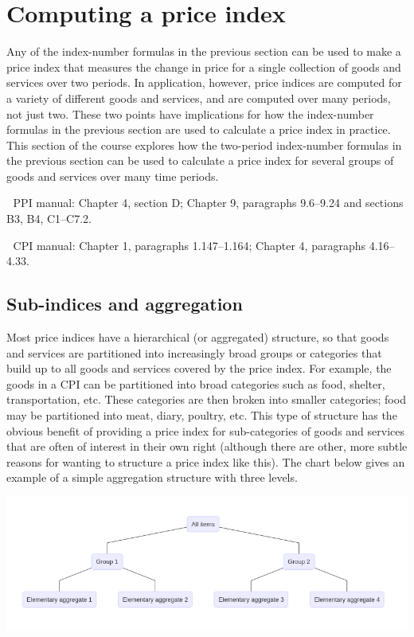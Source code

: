 \documentclass[]{article}
\begin{document}
\hypertarget{computing-a-price-index}{%
\section{Computing a price index}\label{computing-a-price-index}}

Any of the index-number formulas in the previous section can be used to make a price index that measures the change in price for a single collection of goods and services over two periods. In application, however, price indices are computed for a variety of different goods and services, and are computed over many periods, not just two. These two points have implications for how the index-number formulas in the previous section are used to calculate a price index in practice. This section of the course explores how the two-period index-number formulas in the previous section can be used to calculate a price index for several groups of goods and services over many time periods.

📖 PPI manual: Chapter 4, section D; Chapter 9, paragraphs 9.6--9.24 and sections B3, B4, C1--C7.2.

📖 CPI manual: Chapter 1, paragraphs 1.147--1.164; Chapter 4, paragraphs 4.16--4.33.

\hypertarget{sub-indices-and-aggregation}{%
\subsection{Sub-indices and aggregation}\label{sub-indices-and-aggregation}}

Most price indices have a hierarchical (or aggregated) structure, so that goods and services are partitioned into increasingly broad groups or categories that build up to all goods and services covered by the price index. For example, the goods in a CPI can be partitioned into broad categories such as food, shelter, transportation, etc. These categories are then broken into smaller categories; food may be partitioned into meat, diary, poultry, etc. This type of structure has the obvious benefit of providing a price index for sub-categories of goods and services that are often of interest in their own right (although there are other, more subtle reasons for wanting to structure a price index like this). The chart below gives an example of a simple aggregation structure with three levels.

\includegraphics{img/plot1.png}
\end{document}
